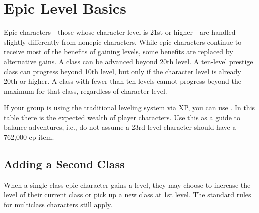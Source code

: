 \section{Epic Level Basics}
Epic characters---those whose character level is 21st or higher---are handled slightly differently from nonepic characters. While epic characters continue to receive most of the benefits of gaining levels, some benefits are replaced by alternative gains. A class can be advanced beyond 20th level. A ten-level prestige class can progress beyond 10th level, but only if the character level is already 20th or higher. A class with fewer than ten levels cannot progress beyond the maximum for that class, regardless of character level.

If your group is using the traditional leveling system via XP, you can use . In this table there is the expected wealth of player characters. Use this as a guide to balance adventures, i.e., do not assume a 23rd-level character should have a 762,000 cp item.






\subsection{Adding a Second Class}
When a single-class epic character gains a level, they may choose to increase the level of their current class or pick up a new class at 1st level. The standard rules for multiclass characters still apply.

